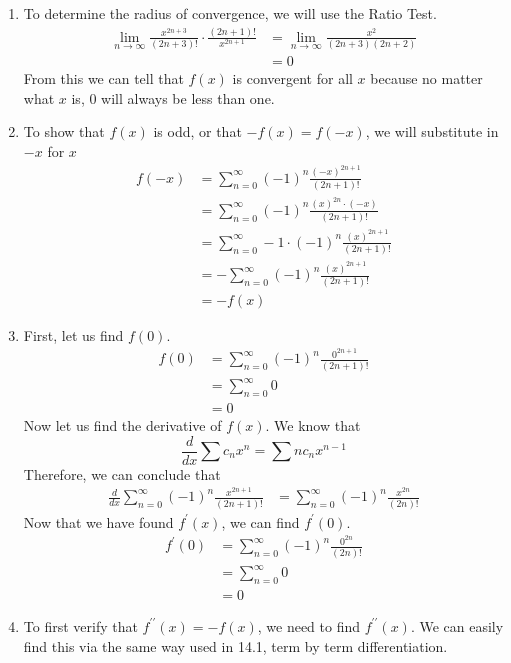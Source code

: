 \documentclass{article}
\begin{document}
\begin{enumerate}[label=\textbf{(14.\arabic*)}]
\begin{enumerate}
    \item To determine the radius of convergence, we will use the Ratio Test.
    \begin{align*}
        \lim_{n\to\infty} \frac{x^{2n+3}}{(2n+3)!}\cdot\frac{(2n+1)!}{x^{2n+1}} &= \lim_{n\to\infty} \frac{x^2}{(2n+3)(2n+2)}\\
        &= 0
    \end{align*}
    From this we can tell that $f(x)$ is convergent for all $x$ because no matter what $x$ is, 0 will always be less than one.
    \item To show that $f(x)$ is odd, or that $-f(x)=f(-x)$, we will substitute in $-x$ for $x$
    \begin{align*}
        f(-x) &= \sum_{n=0}^\infty(-1)^n\frac{(-x)^{2n+1}}{(2n+1)!}\\
        &= \sum_{n=0}^\infty(-1)^n\frac{(x)^{2n}\cdot(-x)}{(2n+1)!}\\
        &= \sum_{n=0}^\infty-1\cdot(-1)^n\frac{(x)^{2n+1}}{(2n+1)!}\\
        &= -\sum_{n=0}^\infty(-1)^n\frac{(x)^{2n+1}}{(2n+1)!}\\
        &= -f(x)
    \end{align*}
    \item  First, let us find $f(0)$. 
    \begin{align*}
        f(0) &= \sum_{n=0}^\infty (-1)^n\frac{0^{2n+1}}{(2n+1)!}\\
        &= \sum_{n=0}^\infty 0\\
        &= 0
    \end{align*}
    Now let us find the derivative of $f(x)$. We know that 
    \[\frac{d}{dx}\sum c_nx^n = \sum nc_nx^{n-1}\]
    Therefore, we can conclude that
    \begin{align*}
    \frac{d}{dx}\sum_{n=0}^\infty (-1)^n\frac{x^{2n+1}}{(2n+1)!} &= \sum_{n=0}^\infty (-1)^n\frac{x^{2n}}{(2n)!}
    \end{align*}
    Now that we have found $f^\prime(x)$, we can find $f^\prime(0)$.
    \begin{align*}
    f^\prime(0) &= \sum_{n=0}^\infty (-1)^n\frac{0^{2n}}{(2n)!}\\
    &= \sum_{n=0}^\infty 0\\
    &= 0
    \end{align*}
    \item To first verify that $f^{\prime\prime}(x)=-f(x)$, we need to find $f^{\prime\prime}(x)$. We can easily find this via the same way used in 14.1, term by term differentiation. 

\end{enumerate}
\end{enumerate}
\end{document}
